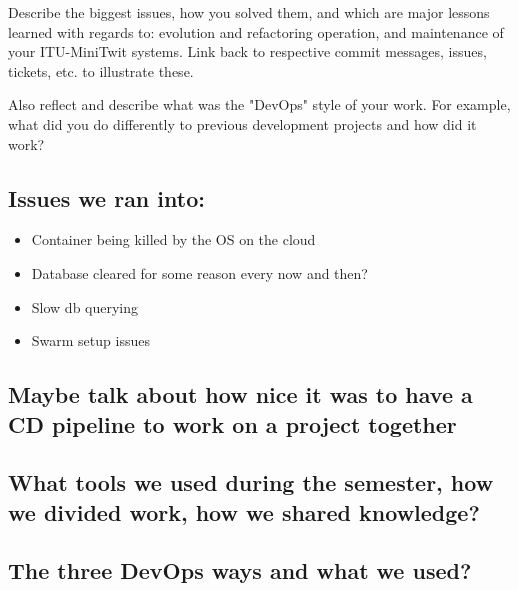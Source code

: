 \documentclass{article}
\begin{document}
Describe the biggest issues, how you solved them, and which are major lessons learned with regards to: evolution and refactoring operation, and maintenance of your ITU-MiniTwit systems. Link back to respective commit messages, issues, tickets, etc. to illustrate these.

Also reflect and describe what was the "DevOps" style of your work. For example, what did you do differently to previous development projects and how did it work?

\subsection{Issues we ran into:}

\begin{itemize}
  \item Container being killed by the OS on the cloud
  \item Database cleared for some reason every now and then?
  \item Slow db querying
  \item Swarm setup issues
\end{itemize}

\subsection{Maybe talk about how nice it was to have a CD pipeline to work on a project together}

\subsection{What tools we used during the semester, how we divided work, how we shared knowledge?}

\subsection{The three DevOps ways and what we used?}
\end{document}
